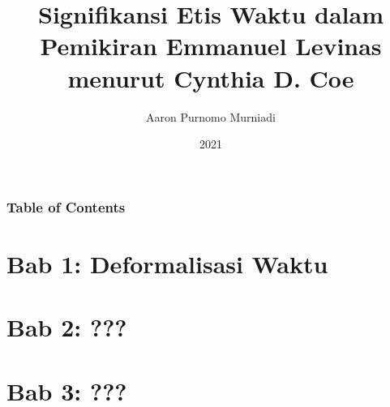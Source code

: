 \documentclass[12pt]{beamer}
\title[Signifikansi Etis Waktu dalam Pemikiran Emmanuel Levinas]{Signifikansi Etis Waktu dalam Pemikiran Emmanuel Levinas\\menurut Cynthia D. Coe}
\author[Aaron P. Murniadi]{Aaron Purnomo Murniadi}
\institute[VFU] %
{
  NPM: 0245710117\\
  Program Sarjana Filsafat\\
  Sekolah Tinggi Filsafat Driyarkara
}
\date[2021]{\small{2021}}
\begin{document}
\frame{\titlepage}

\begin{frame}
  \frametitle{Table of Contents}
  \tableofcontents
\end{frame}

\section{Bab 1: Deformalisasi Waktu}
\lipsum[2-4]

\section{Bab 2: ???}
\lipsum[2-4]

\section{Bab 3: ???}
\lipsum[2-4]
\end{document}
